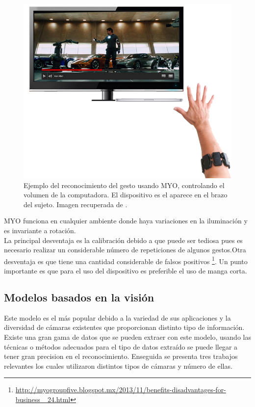 \begin{figure}[h!]
\begin{center}
\includegraphics[scale=.5]{./Figures/MYO.png}
\end{center}
\caption{Ejemplo del reconocimiento del gesto usando MYO, controlando el volumen de la computadora. El dispositivo es el aparece en el brazo del sujeto. Imagen recuperada de \protect \footnotemark{}.}
\label{fig:Myo}
\end{figure}


MYO funciona en cualquier ambiente donde haya variaciones en la iluminación y es invariante a rotación.\\ 
La principal desventaja es la calibración debido a que puede ser tediosa pues es necesario realizar un considerable número de repeticiones de algunos gestos.Otra desventaja es que tiene una cantidad considerable de falsos positivos \footnote{ \url{http://myogroupfive.blogspot.mx/2013/11/benefits-disadvantages-for-business\_ 24.html}}. Un punto importante es que para el uso del dispositivo es preferible el uso de manga corta. 


\subsection{Modelos basados en la visión}   

Este modelo es el más popular debido a la variedad de sus aplicaciones y la diversidad de cámaras existentes que proporcionan distinto tipo de información. Existe una gran gama de datos que se pueden extraer con este modelo, usando las técnicas o métodos adecuados para el tipo de datos extraído se puede llegar a tener gran precision en el reconocimiento. Enseguida se presenta tres trabajos relevantes los cuales utilizaron distintos tipos de cámaras y número de ellas. 

